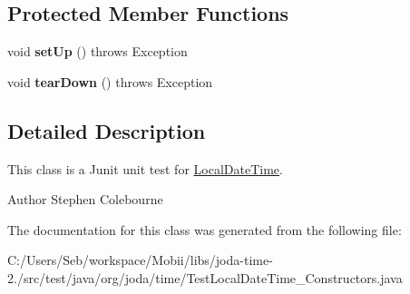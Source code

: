 \subsection*{Protected Member Functions}
\begin{DoxyCompactItemize}
\item 
\hypertarget{classorg_1_1joda_1_1time_1_1_test_local_date_time___constructors_a6e94a73029cd98e9b2eb66109f88df9c}{void {\bfseries set\-Up} ()  throws Exception }\label{classorg_1_1joda_1_1time_1_1_test_local_date_time___constructors_a6e94a73029cd98e9b2eb66109f88df9c}

\item 
\hypertarget{classorg_1_1joda_1_1time_1_1_test_local_date_time___constructors_ad4170f500549ef2b438cc60400f32603}{void {\bfseries tear\-Down} ()  throws Exception }\label{classorg_1_1joda_1_1time_1_1_test_local_date_time___constructors_ad4170f500549ef2b438cc60400f32603}

\end{DoxyCompactItemize}


\subsection{Detailed Description}
This class is a Junit unit test for \hyperlink{classorg_1_1joda_1_1time_1_1_local_date_time}{Local\-Date\-Time}.

\begin{DoxyAuthor}{Author}
Stephen Colebourne 
\end{DoxyAuthor}


The documentation for this class was generated from the following file\-:\begin{DoxyCompactItemize}
\item 
C\-:/\-Users/\-Seb/workspace/\-Mobii/libs/joda-\/time-\/2./src/test/java/org/joda/time/Test\-Local\-Date\-Time\-\_\-\-Constructors.\-java\end{DoxyCompactItemize}
